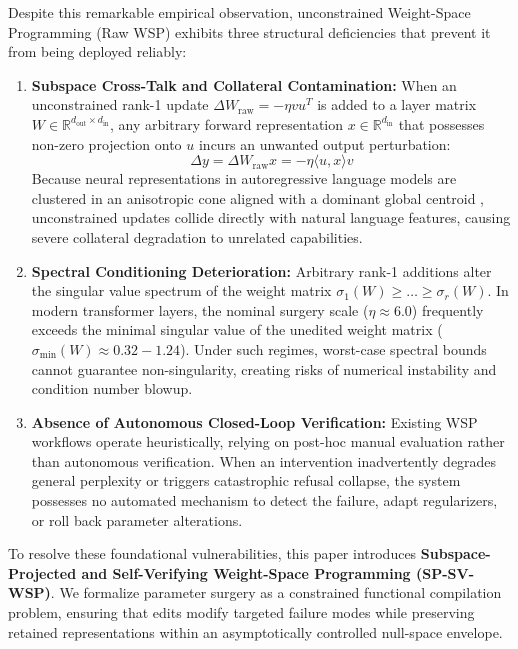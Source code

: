 \documentclass[11pt,a4paper]{article}
\begin{document}
Despite this remarkable empirical observation, unconstrained Weight-Space Programming (Raw WSP) exhibits three structural deficiencies that prevent it from being deployed reliably:
\begin{enumerate}
    \item \textbf{Subspace Cross-Talk and Collateral Contamination:} When an unconstrained rank-1 update $\Delta W_{\text{raw}} = -\eta v u^T$ is added to a layer matrix $W \in \mathbb{R}^{d_{\text{out}} \times d_{\text{in}}}$, any arbitrary forward representation $x \in \mathbb{R}^{d_{\text{in}}}$ that possesses non-zero projection onto $u$ incurs an unwanted output perturbation:
    \begin{equation}
    \Delta y = \Delta W_{\text{raw}} x = -\eta \langle u, x \rangle v
    \end{equation}
    Because neural representations in autoregressive language models are clustered in an anisotropic cone aligned with a dominant global centroid \cite{ethayarajh2019how}, unconstrained updates collide directly with natural language features, causing severe collateral degradation to unrelated capabilities.
    \item \textbf{Spectral Conditioning Deterioration:} Arbitrary rank-1 additions alter the singular value spectrum of the weight matrix $\sigma_1(W) \ge \dots \ge \sigma_r(W)$. In modern transformer layers, the nominal surgery scale ($\eta \approx 6.0$) frequently exceeds the minimal singular value of the unedited weight matrix ($\sigma_{\min}(W) \approx 0.32 - 1.24$). Under such regimes, worst-case spectral bounds cannot guarantee non-singularity, creating risks of numerical instability and condition number blowup.
    \item \textbf{Absence of Autonomous Closed-Loop Verification:} Existing WSP workflows operate heuristically, relying on post-hoc manual evaluation rather than autonomous verification. When an intervention inadvertently degrades general perplexity or triggers catastrophic refusal collapse, the system possesses no automated mechanism to detect the failure, adapt regularizers, or roll back parameter alterations.
\end{enumerate}

To resolve these foundational vulnerabilities, this paper introduces \textbf{Subspace-Projected and Self-Verifying Weight-Space Programming (SP-SV-WSP)}. We formalize parameter surgery as a constrained functional compilation problem, ensuring that edits modify targeted failure modes while preserving retained representations within an asymptotically controlled null-space envelope.
\end{document}
